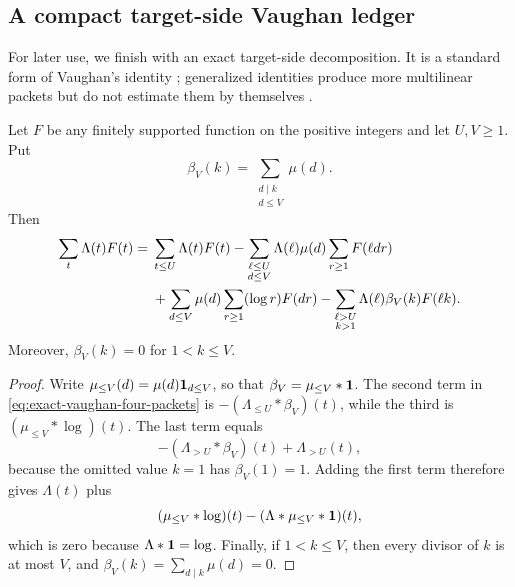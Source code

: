 \subsection{A compact target-side Vaughan ledger}
\label{subsec:compact-vaughan-ledger}

For later use, we finish with an exact target-side decomposition.  It is a
standard form of Vaughan's identity
\citep{Vaughan1977,IwaniecKowalski2004}; generalized identities produce more
multilinear packets but do not estimate them by themselves
\citep{HeathBrownVaughan1982}.

\begin{proposition}
\label{prop:exact-vaughan-ledger}
Let $F$ be any finitely supported function on the positive integers and let
$U,V\geq1$.  Put
\begin{equation}\label{eq:vaughan-beta-coefficient}
 \beta_V(k)=\sum_{\substack{d\mid k\\d\leq V}}\mu(d).
\end{equation}
Then
\begin{align}
 \sum_t\Lambda(t)F(t)
={}&\sum_{t\leq U}\Lambda(t)F(t)
 -\sum_{\substack{\ell\leq U\\d\leq V}}
   \Lambda(\ell)\mu(d)\sum_{r\geq1}F(\ell dr)
 \notag\\
 &+\sum_{d\leq V}\mu(d)\sum_{r\geq1}(\log r)F(dr)
 -\sum_{\substack{\ell>U\\k>1}}
   \Lambda(\ell)\beta_V(k)F(\ell k).
 \label{eq:exact-vaughan-four-packets}
\end{align}
Moreover, $\beta_V(k)=0$ for $1<k\leq V$.
\end{proposition}

\begin{proof}
Write $\mu_{\leq V}(d)=\mu(d)\mathbf 1_{d\leq V}$, so that
$\beta_V=\mu_{\leq V}*\mathbf 1$.  The second term in
\eqref{eq:exact-vaughan-four-packets} is
$-(\Lambda_{\leq U}*\beta_V)(t)$, while the third is
$(\mu_{\leq V}*\log)(t)$.  The last term equals
\[
 - (\Lambda_{>U}*\beta_V)(t)+\Lambda_{>U}(t),
\]
because the omitted value $k=1$ has $\beta_V(1)=1$.  Adding the first term
therefore gives $\Lambda(t)$ plus
\[
 (\mu_{\leq V}*\log)(t)-(\Lambda*\mu_{\leq V}*\mathbf 1)(t),
\]
which is zero because $\Lambda*\mathbf 1=\log$.  Finally, if
$1<k\leq V$, then every divisor of $k$ is at most $V$, and
$\beta_V(k)=\sum_{d\mid k}\mu(d)=0$.
\end{proof}

